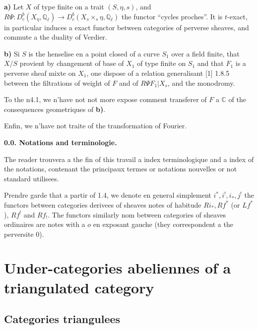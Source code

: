 \documentclass[12pt,a4paper]{article}
\theoremstyle{plain}
\theoremstyle{definition}
\theoremstyle{remark}
\newcommand{\CC}{\mathbb{C}}
\newcommand{\QQ}{\mathbb{Q}}
\begin{document}
\medskip

\noindent
\textbf{a)} Let $X$ of type finite on a trait $(S, \eta, s)$, and $R\Psi : D^{b}_{c}(X_{\eta}, \QQ_{\ell}) \longrightarrow D^{b}_{c}(X_{s} \times_{s} \eta, \QQ_{\ell})$ the functor ``cycles proches''. It is $t$-exact, in particular induces a exact functor between categories of perverse sheaves, and commute a the duality of Verdier.

\smallskip

\noindent
\textbf{b)} Si $S$ is the henselise en a point closed of a curve $S_{1}$ over a field finite, that $X/S$ provient by changement of base of $X_{1}$ of type finite on $S_{1}$ and that $F_{1}$ is a perverse sheaf mixte on $X_{1}$, one dispose of a relation generalisant [1] 1.8.5 between the filtrations of weight of $F$ and of $R\Psi F_{1}|X_{s}$, and the monodromy.

To the n4.1, we n'have not not more expose comment transferer of $F$ a $\CC$ of the consequences geometriques of \textbf{b)}.

Enfin, we n'have not traite of the transformation of Fourier.

\medskip

\noindent
\textbf{0.0. Notations and terminologie.}

The reader trouvera a the fin of this travail a index terminologique and a index of the notations, contenant the principaux termes or notations nouvelles or not standard utilisees.

Prendre garde that a partir of 1.4, we denote en general simplement $i^{*}, i^{!}, i_{*}, j^{!}$ the functors between categories derivees of sheaves notes of habitude $Ri_{*}, Rf^{*}$ (or $Lf^{*}$), $Rf^{!}$ and $Rf_{!}$. The functors similarly nom between categories of sheaves ordinaires are notes with a $o$ en exposant gauche (they correspondent a the perversite $0$).

\newpage

\section{Under-categories abeliennes of a triangulated category}

\subsection{Categories triangulees}
\end{document}
